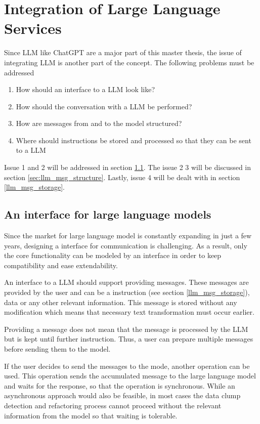 \section{Integration of Large Language Services}

Since \ac{LLM} like ChatGPT are a major part of this master thesis, the issue of integrating \ac{LLM} is another part of the concept. The following problems must be addressed
\begin{enumerate}
    \item How should an interface to a \ac{LLM} look like?
    \item How should the conversation with a \ac{LLM} be performed?
    \item How are messages from and to the model structured?
    \item Where should instructions be stored and processed so that they can be sent to a \ac{LLM}
\end{enumerate}
Issue 1 and 2 will be addressed in section \ref{sec:llm_interface}. The issue 2 3 will be discussed in section \ref{sec:llm_msg_structure}. Lastly, issue 4 will be dealt with in section \ref{llm_msg_storage}.
\subsection{An interface for large language models}\label{sec:llm_interface}

Since the market for large language model is constantly expanding in just a few years, designing a interface for communication is challenging. As a result, only the core functionality can be modeled by an interface in order to keep compatibility and ease extendability. 

An interface to a \ac{LLM} should support providing messages. These messages are provided by the user and can be a instruction (see  section \ref{llm_msg_storage}), data or any other relevant information. This message is stored without any modification which means that necessary text transformation must occur earlier. 

Providing a message does not mean that the message is processed by the \ac{LLM} but is kept until further instruction. Thus, a user can prepare multiple messages before sending them to the model.

If the user decides to send the messages to the mode, another operation can be used. This operation sends the accumulated message to the large language model and waits for the response, so that the operation is synchronous. While an asynchronous approach would also be feasible, in most cases the data clump detection and refactoring process cannot proceed without the relevant information from the model so that waiting is tolerable. 

